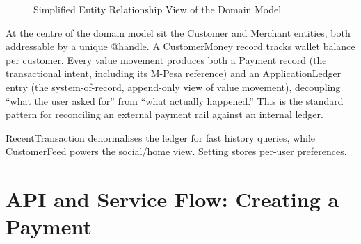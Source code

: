 \documentclass[12pt, a4paper, twoside, openright]{report}
\begin{document}
\begin{figure}[H]
    \centering
    \caption{Simplified Entity Relationship View of the Domain Model}
\end{figure}

At the centre of the domain model sit the Customer and Merchant entities, both addressable by a unique @handle. A CustomerMoney record tracks wallet balance per customer. Every value movement produces both a Payment record (the transactional intent, including its M-Pesa reference) and an ApplicationLedger entry (the system-of-record, append-only view of value movement), decoupling ``what the user asked for'' from ``what actually happened.'' This is the standard pattern for reconciling an external payment rail against an internal ledger.

RecentTransaction denormalises the ledger for fast history queries, while CustomerFeed powers the social/home view. Setting stores per-user preferences.

\section{API and Service Flow: Creating a Payment}
\end{document}
